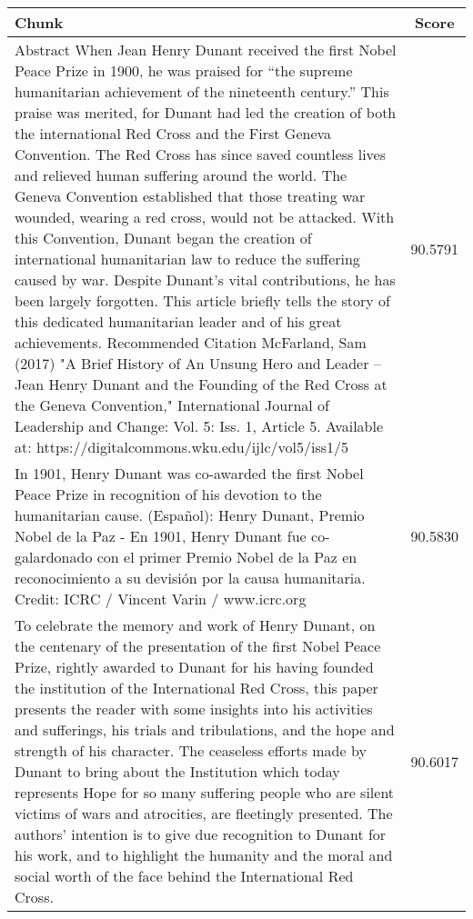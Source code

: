 \begin{table}[h!]
    \footnotesize
    \caption{Evaluation of text segmentation using a chunk Size of 512, text chunks derived from the entry "Henry Dunant award Nobel Peace Prize".}
    \begin{xltabular}{\linewidth}{X|c}
        \toprule
        \textbf{Chunk} & \textbf{Score} \\
        \midrule
        Abstract When Jean Henry Dunant received the first Nobel Peace Prize in 1900, he was praised for “the supreme humanitarian achievement of the nineteenth century.” This praise was merited, for Dunant had led the creation of both the international Red Cross and the First Geneva Convention. The Red Cross has since saved countless lives and relieved human suffering around the world. The Geneva Convention established that those treating war wounded, wearing a red cross, would not be attacked. With this Convention, Dunant began the creation of international humanitarian law to reduce the suffering caused by war. Despite Dunant’s vital contributions, he has been largely forgotten. This article briefly tells the story of this dedicated humanitarian leader and of his great achievements. Recommended Citation McFarland, Sam (2017) "A Brief History of An Unsung Hero and Leader – Jean Henry Dunant and the Founding of the Red Cross at the Geneva Convention," International Journal of Leadership and Change: Vol. 5: Iss. 1, Article 5. Available at: https://digitalcommons.wku.edu/ijlc/vol5/iss1/5 & 90.5791\\ \hline
        In 1901, Henry Dunant was co-awarded the first Nobel Peace Prize in recognition of his devotion to the humanitarian cause. (Español): Henry Dunant, Premio Nobel de la Paz - En 1901, Henry Dunant fue co-galardonado con el primer Premio Nobel de la Paz en reconocimiento a su devisión por la causa humanitaria. Credit: ICRC / Vincent Varin / www.icrc.org & 90.5830\\ \hline
        To celebrate the memory and work of Henry Dunant, on the centenary of the presentation of the first Nobel Peace Prize, rightly awarded to Dunant for his having founded the institution of the International Red Cross, this paper presents the reader with some insights into his activities and sufferings, his trials and tribulations, and the hope and strength of his character. The ceaseless efforts made by Dunant to bring about the Institution which today represents Hope for so many suffering people who are silent victims of wars and atrocities, are fleetingly presented. The authors' intention is to give due recognition to Dunant for his work, and to highlight the humanity and the moral and social worth of the face behind the International Red Cross. & 90.6017 \\
        \bottomrule
    \end{xltabular}
    \label{tab:table-text-splitter}
\end{table}

